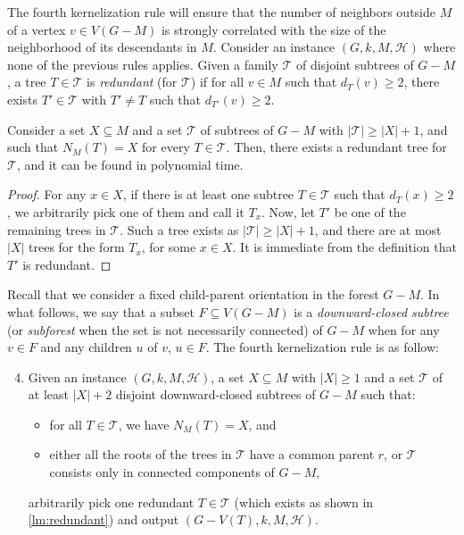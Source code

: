 \documentclass{amsart}
\newcommand{\KR}[1]{KR$_ #1$}
\newcommand{\T}{\mathcal{T}}
\newcommand{\mH}{\mathcal{H}}
\begin{document}
The fourth kernelization rule will ensure that the number of neighbors outside $M$ of a vertex $v\in V(G-M)$ is strongly correlated with the size of the neighborhood of its descendants in $M$. 
Consider an instance $(G,k,M,\mH)$ where none of the previous rules applies. 
Given a family $\T$ of disjoint subtrees of $G-M$, a tree $T\in \T$ is {\em redundant} (for $\T$) if for all $v\in M$ such that $d_T(v)\geq 2$, there exists $T'\in \T$ with $T'\neq T$ such that $d_{T'}(v)\geq 2$.


\begin{lemma}\label{lm:redundant}
    Consider a set $X\subseteq M$ and a set $\T$ of subtrees of $G-M$ with $|\T|\geq|X|+1$, and such that $N_M(T)=X$ for every $T\in \T$. Then, there exists a redundant tree for $\T$, and it can be found in polynomial time.
\end{lemma}
\begin{proof}
    For any $x\in X$, if there is at least one subtree $T\in \T$ such that $d_T(x)\geq 2$, we arbitrarily pick one of them and call it $T_{x}$. Now, let $T'$ be one of the remaining trees in $\T$. Such a tree exists as $|\T|\geq |X|+1$, and there are at most $|X|$ trees for the form $T_x$, for some $x\in X$. It is immediate from the definition that $T'$ is redundant.
\end{proof}

Recall that we consider a fixed child-parent orientation in the forest $G-M$. In what follows, we say that a subset $F \subseteq V(G-M)$ is a \emph{downward-closed subtree} (or \emph{subforest} when the set is not necessarily connected) of $G-M$ when for any $v \in F$ and any children $u$ of $v$, $u \in F$.
The fourth kernelization rule is as follow:

\begin{enumerate}[label=(\KR{{\arabic*}})]
\setcounter{enumi}{3}
\item \label{rl:same_neighborhood_prime} Given an instance $(G, k, M, \mH)$, a set $X\subseteq M$ with $|X|\geq 1$ and a set $\T$ of at least $|X|+2$ disjoint downward-closed subtrees of $G-M$ such that:
\begin{itemize}
    \item for all $T\in \T$, we have $N_M(T)=X$, and
    \item either all the roots of the trees in $\T$ have a common parent $r$, or $\T$ consists only in connected components of $G-M$,
\end{itemize}
arbitrarily pick one 
redundant $T\in \T$ (which exists as shown in \autoref{lm:redundant}) and output $(G - V(T), k, M, \mH)$.
\end{enumerate}
\end{document}
